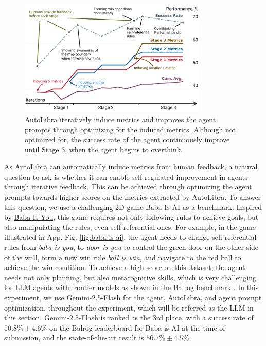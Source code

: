 \documentclass[../main.tex]{subfiles}
\begin{document}

\begin{figure}[!b]
	\centering
	\includegraphics[width=0.8\textwidth]{figs/running_maximum_plot.pdf}
	\caption{AutoLibra iteratively induce metrics and improves the agent prompts
	through optimizing for the induced metrics. Although not optimized for, the
	success rate of the agent continuously improve until Stage 3, when the agent begins
	to overthink.}
	\label{fig:autolibra_self_improving}
\end{figure}

As AutoLibra can automatically induce metrics from human feedback, a natural
question to ask is whether it can enable self-regulated improvement in agents
through iterative feedback. This can be achieved through optimizing the agent prompts
towards higher scores on the metrics extracted by AutoLibra. To answer this
question, we use a challenging 2D game Baba-Is-AI \citep{cloos2024babaaibreakrules, paglieri2024balrog}
as a benchmark. Inspired by \href{https://hempuli.com/baba/}{Baba-Is-You}, this
game requires not only following rules to achieve goals, but also manipulating the
rules, even self-referential ones. For example, in the game illustrated in App. Fig.
\ref{fig:baba-is-ai}, the agent needs to change self-referential rules from \textsl{baba
is you}, to \textsl{door is you} to control the green door on the other side of
the wall, form a new win rule \textsl{ball is win}, and navigate to the red ball
to achieve the win condition. To achieve a high score on this dataset, the agent
needs not only planning, but also metacognitive skills, which is very challenging
for LLM agents with frontier models as shown in the Balrog benchmark \citep{paglieri2024balrog}.
In this experiment, we use Gemini-2.5-Flash \citep{geminiteam2025geminifamilyhighlycapable}
for the agent, AutoLibra, and agent prompt optimization, throughout the
experiment, which will be referred as the LLM in this section. Gemini-2.5-Flash
is ranked as the 3rd place, with a success rate of $50.8\%\pm 4.6\%$ on the Balrog
leaderboard for Baba-is-AI at the time of submission, and the state-of-the-art
result is $56.7\%\pm4.5\%$.
\end{document}
